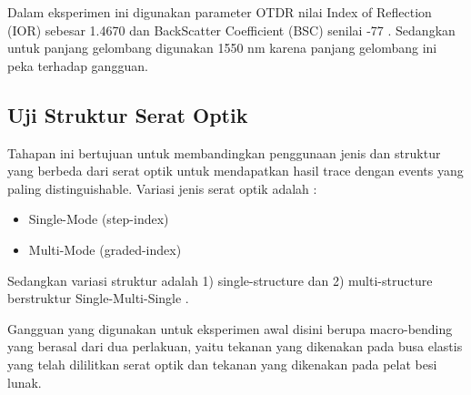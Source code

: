 \documentclass[12pt]{article}
\begin{document}
	Dalam eksperimen ini digunakan parameter OTDR nilai Index of Reflection (IOR) sebesar 1.4670 dan BackScatter Coefficient (BSC) senilai -77 \cite{Hafid2014}.
	Sedangkan untuk panjang gelombang digunakan 1550 nm karena panjang gelombang ini peka terhadap gangguan. 

	\subsection{Uji Struktur Serat Optik}
	
	Tahapan ini bertujuan untuk membandingkan penggunaan jenis dan struktur yang berbeda dari serat optik untuk mendapatkan hasil trace dengan events yang paling distinguishable.
	Variasi jenis serat optik adalah \cite{Hafid2014}:
	
	\begin{itemize}
		\item Single-Mode (step-index)
		\item Multi-Mode (graded-index)
	\end{itemize}

	Sedangkan variasi struktur adalah 1) single-structure dan 2) multi-structure berstruktur Single-Multi-Single \cite{Diana}.
	
	Gangguan yang digunakan untuk eksperimen awal disini berupa macro-bending yang berasal dari dua perlakuan, yaitu tekanan yang dikenakan pada busa elastis yang telah dililitkan serat optik dan tekanan yang dikenakan pada pelat besi lunak.
	
\end{document}
